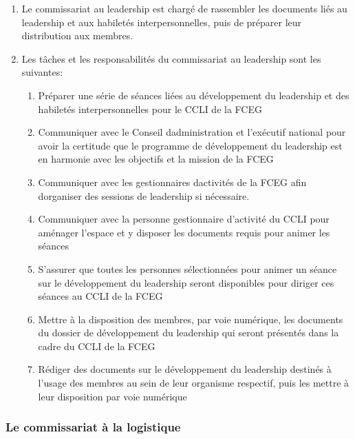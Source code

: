 \begin{enumerate}
 \item
  Le commissariat au leadership est chargé de rassembler les documents liés au leadership et aux habiletés interpersonnelles, puis de préparer leur distribution aux membres.
 \item
  Les tâches et les responsabilités du commissariat au leadership sont les suivantes:

  \begin{enumerate}
   \item
    Préparer une série de séances liées au développement du leadership et des habiletés interpersonnelles pour le CCLI de la FCEG
   \item
    Communiquer avec le Conseil d\textquotesingle administration et l’exécutif national pour avoir la certitude que le programme de développement du leadership est en harmonie avec les objectifs et la mission de la FCEG
   \item
    Communiquer avec les gestionnaires d\textquotesingle activités de la FCEG afin d\textquotesingle organiser des sessions de leadership si nécessaire.
   \item
    Communiquer avec la personne gestionnaire d’activité du CCLI pour aménager l’espace et y disposer les documents requis pour animer les séances
   \item
    S’assurer que toutes les personnes sélectionnées pour animer un séance sur le développement du leadership seront disponibles pour diriger ces séances au CCLI de la FCEG
   \item
    Mettre à la disposition des membres, par voie numérique, les documents du dossier de développement du leadership qui seront présentés dans la cadre du CCLI de la FCEG
   \item
    Rédiger des documents sur le développement du leadership destinés à l’usage des membres au sein de leur organisme respectif, puis les mettre à leur disposition par voie numérique
  \end{enumerate}
\end{enumerate}

\subsubsection{Le commissariat à la logistique}
\label{le-commissariat-a-la-logistique}

